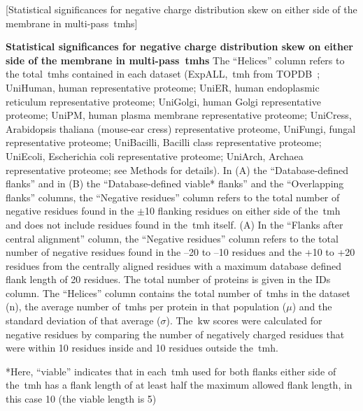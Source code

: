 \begin{table}[htbp]
  \centering
  [Statistical significances for negative charge distribution skew on either side of the membrane in multi-pass~\gls{tmh}s]{\textbf{Statistical significances for negative charge distribution skew on either side of the membrane in multi-pass~\gls{tmh}s}
The ``Helices'' column refers to the total~\gls{tmh}s contained in each dataset (ExpALL,~\gls{tmh} from TOPDB~\cite{Dobson2015}; UniHuman, human representative proteome; UniER, human endoplasmic reticulum representative proteome; UniGolgi, human Golgi representative proteome; UniPM, human plasma membrane representative proteome; UniCress, Arabidopsis thaliana (mouse-ear cress) representative proteome, UniFungi, fungal representative proteome; UniBacilli, Bacilli class representative proteome; UniEcoli, Escherichia coli representative proteome; UniArch, Archaea representative proteome; see Methods for details).
In (A) the ``Database-defined flanks'' and in (B) the ``Database-defined viable* flanks'' and the ``Overlapping flanks'' columns, the ``Negative residues'' column refers to the total number of negative residues found in the $\pm$10 flanking residues on either side of the~\gls{tmh} and does not include residues found in the~\gls{tmh} itself.
(A) In the ``Flanks after central alignment'' column, the ``Negative residues'' column refers to the total number of negative residues found in the –20 to –10 residues and the +10 to +20 residues from the centrally aligned residues with a maximum database defined flank length of 20 residues.
The total number of proteins is given in the IDs column.
The ``Helices'' column contains the total number of~\gls{tmh}s in the dataset (n), the average number of~\gls{tmh}s per protein in that population ($\mu$) and the standard deviation of that average ($\sigma$).
The~\gls{kw} scores were calculated for negative residues by comparing the number of negatively charged residues that were within 10 residues inside and 10 residues outside the~\gls{tmh}.

*Here, ``viable'' indicates that in each~\gls{tmh} used for both flanks either side of the~\gls{tmh} has a flank length of at least half the maximum allowed flank length, in this case 10 (the viable length is 5)}


\end{table}
